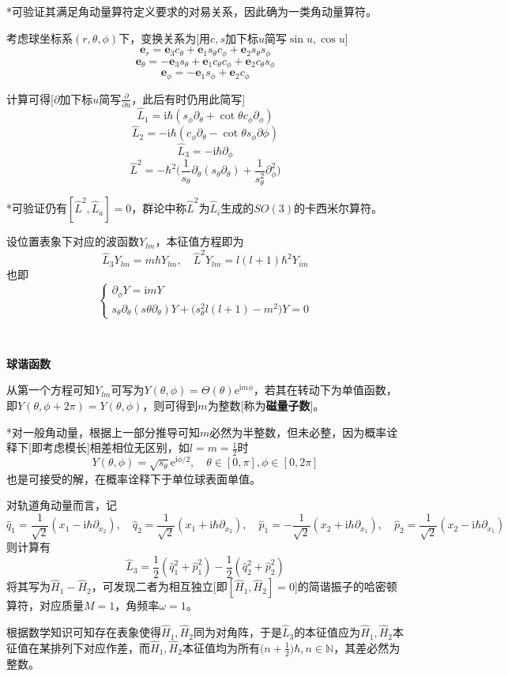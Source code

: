 \documentclass[a4paper,UTF8,fontset=windows]{ctexart}
\newcommand*{\ir}{\mathrm{i}}
\newcommand*{\er}{\mathrm{e}}
\newcommand*{\be}{\mathbf{e}}
\begin{document}
*可验证其满足角动量算符定义要求的对易关系，因此确为一类角动量算符。

考虑球坐标系$(r,\theta,\phi)$下，变换关系为[用$c,s$加下标$u$简写$\sin u,\cos u$]
$$\be_r=\be_3c_\theta+\be_1s_\theta c_\phi+\be_2s_\theta s_\phi$$
$$\be_\theta=-\be_3s_\theta+\be_1c_\theta c_\phi+\be_2c_\theta s_\phi$$
$$\be_\phi=-\be_1s_\phi+\be_2c_\phi$$

计算可得[$\partial$加下标$u$简写$\frac{\partial}{\partial u}$，此后有时仍用此简写]
$$\hat{L}_1=\ir\hbar(s_\phi\partial_\theta+\cot\theta c_\phi\partial_\phi)$$
$$\hat{L}_2=-\ir\hbar(c_\phi\partial_\theta-\cot\theta s_\phi\partial\phi)$$
$$\hat{L}_3=-\ir\hbar\partial_\phi$$
$$\hat{L}^2=-\hbar^2\bigg(\frac{1}{s_\theta}\partial_\theta(s_\theta\partial_\theta)+\frac{1}{s_\theta^2}\partial_\phi^2\bigg)$$

*可验证仍有$[\hat{L}^2,\hat{L}_a]=0$，群论中称$\hat{L}^2$为$\hat{L}_i$生成的$SO(3)$的卡西米尔算符。

设位置表象下对应的波函数$Y_{lm}$，本征值方程即为
$$\hat{L}_3Y_{lm}=m\hbar Y_{lm},\quad\hat{L}^2Y_{lm}=l(l+1)\hbar^2Y_{im}$$
也即
$$\begin{cases}\partial_\phi Y=\ir mY\\s_\theta\partial_\theta(s\theta\partial_\theta)Y+\big(s_\theta^2l(l+1)-m^2\big)Y=0\end{cases}$$

\

\textbf{球谐函数}

从第一个方程可知$Y_{lm}$可写为$Y(\theta,\phi)=\Theta(\theta)\er^{\ir m\phi}$，若其在转动下为单值函数，即$Y(\theta,\phi+2\pi)=Y(\theta,\phi)$，则可得到$m$为整数[称为\textbf{磁量子数}]。

*对一般角动量，根据上一部分推导可知$m$必然为半整数，但未必整，因为概率诠释下[即考虑模长]相差相位无区别，如$l=m=\frac{1}{2}$时
$$Y(\theta,\phi)=\sqrt{s_\theta}\er^{\ir\phi/2},\quad\theta\in[0,\pi],\phi\in[0,2\pi]$$
也是可接受的解，在概率诠释下于单位球表面单值。

对轨道角动量而言，记
$$\hat{q}_1=\frac{1}{\sqrt2}(x_1-\ir\hbar\partial_{x_2}),\quad\hat{q}_2=\frac{1}{\sqrt2}(x_1+\ir\hbar\partial_{x_2}),\quad\hat{p}_1=-\frac{1}{\sqrt2}(x_2+\ir\hbar\partial_{x_1}),\quad\hat{p}_2=\frac{1}{\sqrt2}(x_2-\ir\hbar\partial_{x_1})$$
则计算有
$$\hat{L}_3=\frac{1}{2}(\hat{q}_1^2+\hat{p}_1^2)-\frac{1}{2}(\hat{q}_2^2+\hat{p}_2^2)$$
将其写为$\hat{H}_1-\hat{H}_2$，可发现二者为相互独立[即$[\hat{H}_1,\hat{H}_2]=0$]的简谐振子的哈密顿算符，对应质量$M=1$，角频率$\omega=1$。

根据数学知识可知存在表象使得$\hat{H}_1,\hat{H}_2$同为对角阵，于是$\hat{L}_3$的本征值应为$\hat{H}_1,\hat{H}_2$本征值在某排列下对应作差，而$\hat{H}_1,\hat{H}_2$本征值均为所有$\big(n+\frac{1}{2}\big)\hbar,n\in\mathbb{N}$，其差必然为整数。
\end{document}
